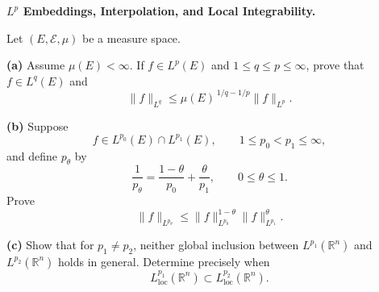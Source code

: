 \begin{problem}[CP-II-0480]
\label{prob:cp-ii-0480}
\textbf{\(L^p\) Embeddings, Interpolation, and Local Integrability.}

\hspace*{1.5em}Let \((E,\mathcal E,\mu)\) be a measure space.

\par\smallskip\noindent\textbf{(a)}\quad
Assume \(\mu(E)<\infty\). If \(f\in L^p(E)\) and
\(1\le q\le p\le\infty\), prove that \(f\in L^q(E)\) and
\[
\|f\|_{L^q}
\le
\mu(E)^{\,1/q-1/p}\|f\|_{L^p}.
\]

\par\smallskip\noindent\textbf{(b)}\quad
Suppose
\[
f\in L^{p_0}(E)\cap L^{p_1}(E),
\qquad
1\le p_0<p_1\le\infty,
\]
and define \(p_\theta\) by
\[
\frac1{p_\theta}
=
\frac{1-\theta}{p_0}+\frac{\theta}{p_1},
\qquad 0\le\theta\le1.
\]
Prove
\[
\|f\|_{L^{p_\theta}}
\le
\|f\|_{L^{p_0}}^{1-\theta}
\|f\|_{L^{p_1}}^\theta.
\]

\par\smallskip\noindent\textbf{(c)}\quad
Show that for \(p_1\ne p_2\), neither global inclusion between
\(L^{p_1}(\mathbb R^n)\) and \(L^{p_2}(\mathbb R^n)\) holds in general.
Determine precisely when
\[
L^{p_1}_{\mathrm{loc}}(\mathbb R^n)
\subset
L^{p_2}_{\mathrm{loc}}(\mathbb R^n).
\]
\end{problem}

